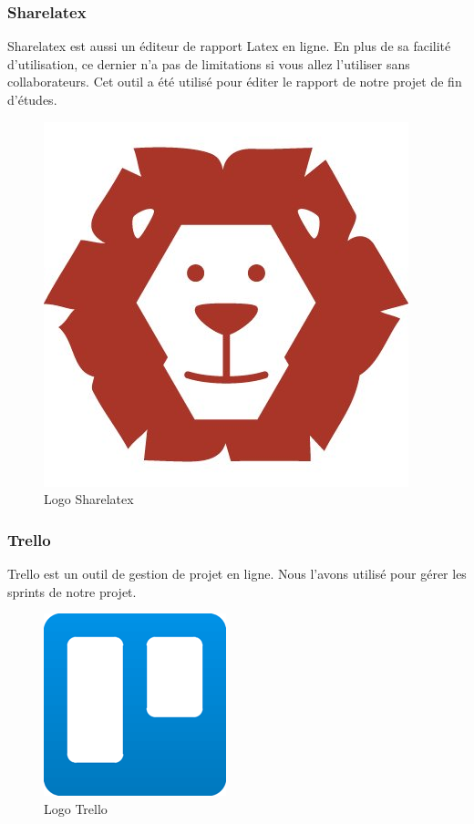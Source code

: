 \subsubsection{Sharelatex}
\noindent\begin{minipage}{0.69\textwidth}
Sharelatex est aussi un éditeur de rapport Latex en ligne. En plus de sa facilité d'utilisation, ce dernier n'a pas de limitations si vous allez l'utiliser sans collaborateurs. Cet outil a été utilisé pour éditer le rapport de notre projet de fin d'études.
\end{minipage}
\begin{minipage}{0.3\textwidth}
\begin{figure}[H]
  \centering
  \includegraphics[scale=0.25]{figures/logo/sharelatex.jpg}
  \caption{Logo Sharelatex}
  \label{code52}
\end{figure}
\end{minipage}
\subsubsection{Trello}
\noindent\begin{minipage}{0.69\textwidth}
Trello est un outil de gestion de projet en ligne. Nous l'avons utilisé pour gérer les sprints de notre projet.
\end{minipage}
\begin{minipage}{0.3\textwidth}
\begin{figure}[H]
  \centering
  \includegraphics[scale=0.3]{figures/logo/trello.png}
  \caption{Logo Trello}
  \label{code29}
\end{figure}
\end{minipage}
